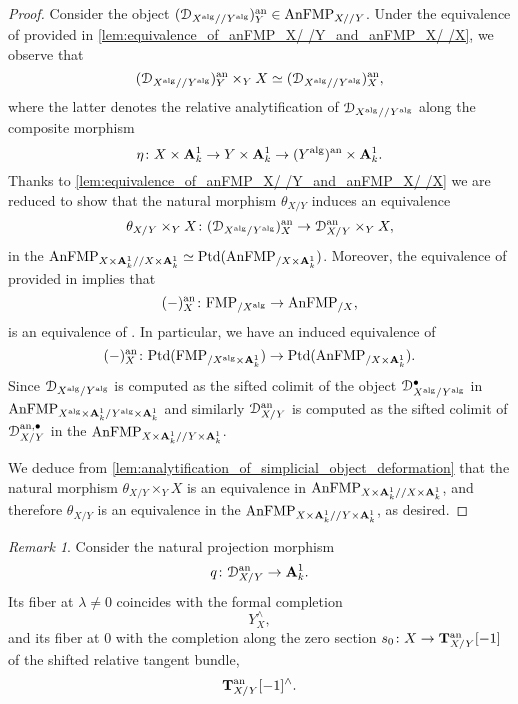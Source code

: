 \documentclass[10pt,a4paper,reqno]{amsart} %
\theoremstyle{plain}
\theoremstyle{definition}
\theoremstyle{remark}
\newtheorem{rem}[thm]{Remark}
\numberwithin{equation}{section}
\begin{document}
\begin{proof}
    Consider the object $(\mathcal D_{X^\mathrm{alg}/ /Y^\mathrm{alg}})^\mathrm{an}_Y \in \mathrm{AnFMP}_{X/ /Y}$. Under the equivalence of \infcats provided in \cref{lem:equivalence_of_anFMP_X/ /Y_and_anFMP_X/ /X},
    we observe that
        \[
            (\mathcal D_{X^\mathrm{alg}/ /Y^\mathrm{alg}})^\mathrm{an}_Y \times_Y X \simeq (\mathcal D_{X^\mathrm{alg}/ /Y^\mathrm{alg}})^\mathrm{an}_X ,
        \]
    where the latter denotes the relative analytification of $\mathcal D_{X^\mathrm{alg}/ /Y^\mathrm{alg}}$ along the composite morphism
        \[
            \eta \colon X \times \mathbf A^1_k \to Y \times \mathbf A^1_k \to (Y^\mathrm{alg})^\mathrm{an} \times \mathbf A^1_k.  
        \]
    Thanks to \cref{lem:equivalence_of_anFMP_X/ /Y_and_anFMP_X/ /X} we are reduced to show that the natural morphism $\theta_{X/ Y}$ induces an equivalence
        \[
            \theta_{X/ Y} \times_Y X \colon (\mathcal D_{X^\mathrm{alg}/ Y^\mathrm{alg}})^\mathrm{an}_X \to \mathcal D_{X/ Y}^\mathrm{an} \times_Y X , 
        \]
    in the \infcat $\mathrm{AnFMP}_{X \times \mathbf A^1_k/ /X \times \mathbf A^1_k} \simeq \mathrm{Ptd}(\mathrm{AnFMP}_{/X\times\mathbf A^1_k})$.
    Moreover, the equivalence of \infcats provided in \cite[Theorem 6.12]{Porta_Yu_NQK} implies that 
        \[
            (-)_X^\mathrm{an} \colon \mathrm{FMP}_{/ X^\mathrm{alg}} \to \mathrm{AnFMP}_{/ X}  ,
        \]
    is an equivalence of \infcats. In particular, we have an induced equivalence of \infcats
        \[
            (-)_X^\mathrm{an} \colon \mathrm{Ptd}(\mathrm{FMP}_{/X ^\mathrm{alg}\times\mathbf A^1_k}) \to \mathrm{Ptd}(\mathrm{AnFMP}_{/X\times\mathbf A^1_k}).
        \]
    Since $\mathcal D_{X^\mathrm{alg}/ Y^\mathrm{alg}}$ is computed as the sifted colimit of the object $\mathcal D^\bullet_{X^\mathrm{alg}/ Y^\mathrm{alg}}$ in $\mathrm{AnFMP}_{X^\mathrm{alg} \times \mathbf A^1_k/ Y^\mathrm{alg} \times \mathbf A^1_k}$
    and similarly $\mathcal D^\mathrm{an}_{X/ Y}$ is computed as the sifted colimit of $\mathcal D^{\mathrm{an}, \bullet}_{X/ Y}$ in the \infcat $\mathrm{AnFMP}_{X\times\mathbf A^1_k/ /Y\times\mathbf A^1_k}$.
    
    We deduce from \cref{lem:analytification_of_simplicial_object_deformation} that the natural morphism $\theta_{X/Y} \times_Y X$ is an equivalence in $\mathrm{AnFMP}_{X \times \mathbf A^1_k/ /X \times \mathbf A^1_k}$,
    and therefore $\theta_{X/ Y}$ is an equivalence in the \infcat $\mathrm{AnFMP}_{X\times\mathbf A^1_k/ /Y\times\mathbf A^1_k}$, as desired.
\end{proof}

\begin{rem}
    Consider the natural projection morphism
        \[
            q \colon \mathcal D_{X/ Y}^\mathrm{an} \to \mathbf A^1_k.
        \]
    Its fiber at $\lambda \neq 0$ coincides with the formal completion
        \[
            Y^\wedge_X,  
        \]
    and its fiber at $0$ with the completion along the zero section $s_0 \colon X \to \mathbf T^\mathrm{an}_{X/ Y}[-1]$ of the shifted relative tangent bundle,
        \[
            \mathbf T^\mathrm{an}_{X/ Y} [-1]^{\wedge}.
        \]
\end{rem}
\end{document}
